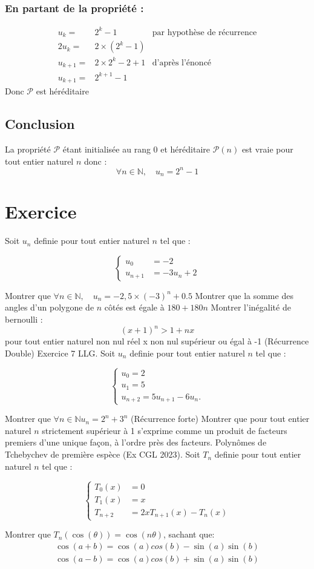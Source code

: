 \documentclass{exam}
\newcommand*{\p}{\mathcal{P}}
\newcommand*{\n}{\mathbb{N}}
\newcommand*{\sys}[1]{
  \[
\left\{
\begin{array}{lll}
  #1
\end{array}
\right .
\]
}
\begin{document}
\subsubsection{En partant de la propriété :}
\begin{align*}
u_k=&2^k-1
&
\text{par hypothèse de récurrence}
\\
2u_k=&2\times\left(2^k-1\right)
\\
u_{k+1}=&2\times2^k-2+1
&
\text{d'après l'énoncé}
\\
u_{k+1}=&2^{k+1}-1
\end{align*}
Donc $\p$ est héréditaire
\subsection{Conclusion}
La propriété $\p$ étant initialisée au rang 0 et héréditaire $\p(n)$ est vraie pour
tout entier naturel $n$ donc :
$$
\forall n\in\n,
\quad
u_n=2^n-1
$$
\section{Exercice}
\begin{questions}
\question Soit $u_n$ definie pour tout entier naturel $n$ tel que :
\sys{
u_0&=-2\\
u_{n+1}&=-3u_n+2
}
Montrer que $
\forall n\in\n,
\quad
u_n=-2,5\times(-3)^n+0.5
$
\question Montrer que la somme des angles d'un polygone de $n$ côtés est égale à $180+180n$
\question Montrer l'inégalité de bernoulli : 
$$
(x+1)^n>1+nx
$$
pour tout entier naturel non nul réel x non nul supérieur ou égal à -1
\question (Récurrence Double) Exercice 7 LLG. Soit $u_n$ definie pour tout entier naturel $n$ tel que :
\sys{
u_0 = 2
\\
u_1 = 5
\\
u_{n+2} = 5u_{n+1} - 6u_n.
}
Montrer que
$\forall n\in\n u_n = 2^n + 3^n$
\question (Récurrence forte) Montrer que pour tout entier naturel $n$ strictement supérieur à 1 
s'exprime comme un produit de facteurs premiers d'une unique façon, à l'ordre près des facteurs.
\question Polynômes de Tchebychev de première espèce (Ex CGL 2023).
Soit $T_n$ definie pour tout entier naturel $n$ tel que :
\sys{
T_0(x)&=0
\\
T_1(x)&=x
\\
T_{n+2}&=2xT_{n+1}(x)-T_n(x)
}
Montrer que $T_n(\cos(\theta))=\cos(n\theta)$, sachant que:
\begin{align*}
\cos(a+b)=\cos(a)cos(b)-\sin(a)\sin(b)\\
\cos(a-b)=\cos(a)cos(b)+\sin(a)\sin(b)
\end{align*}
\end{questions}
\end{document}
